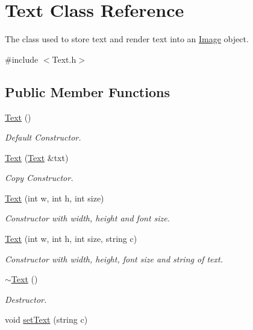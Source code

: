 \hypertarget{class_text}{\section{Text Class Reference}
\label{class_text}
}


The class used to store text and render text into an \hyperlink{class_image}{Image} object.  




{\ttfamily \#include $<$Text.\-h$>$}

\subsection*{Public Member Functions}
\begin{DoxyCompactItemize}
\item 
\hyperlink{class_text_ab3e26143fccc52699bcc5149cae852bc}{Text} ()
\begin{DoxyCompactList}\small\item\em Default Constructor. \end{DoxyCompactList}\item 
\hyperlink{class_text_a961009f9b86e79ed9a325b5e2dd0f3ae}{Text} (\hyperlink{class_text}{Text} \&txt)
\begin{DoxyCompactList}\small\item\em Copy Constructor. \end{DoxyCompactList}\item 
\hyperlink{class_text_a79ab4b6e0aeccad7c1afa0db4a476f38}{Text} (int w, int h, int size)
\begin{DoxyCompactList}\small\item\em Constructor with width, height and font size. \end{DoxyCompactList}\item 
\hyperlink{class_text_a24e7df3620c8650eb81b825dbc9c3d1f}{Text} (int w, int h, int size, string c)
\begin{DoxyCompactList}\small\item\em Constructor with width, height, font size and string of text. \end{DoxyCompactList}\item 
\hyperlink{class_text_a2d49e5c280e205125b149f7777ae30c7}{$\sim$\-Text} ()
\begin{DoxyCompactList}\small\item\em Destructor. \end{DoxyCompactList}\item 
void \hyperlink{class_text_a2004a4210f6a0b584bec7272b9cedcfb}{set\-Text} (string c)

\end{DoxyCompactItemize}
